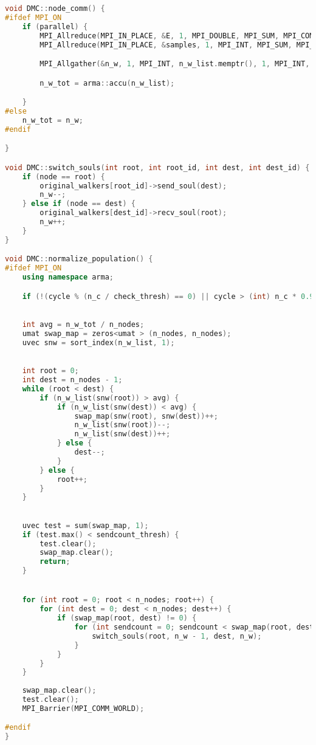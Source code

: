 \newpage
\begin{lstlisting}[language=c++, basicstyle=\scriptsize]
void DMC::node_comm() {
#ifdef MPI_ON
    if (parallel) {
        MPI_Allreduce(MPI_IN_PLACE, &E, 1, MPI_DOUBLE, MPI_SUM, MPI_COMM_WORLD);
        MPI_Allreduce(MPI_IN_PLACE, &samples, 1, MPI_INT, MPI_SUM, MPI_COMM_WORLD);

        MPI_Allgather(&n_w, 1, MPI_INT, n_w_list.memptr(), 1, MPI_INT, MPI_COMM_WORLD);

        n_w_tot = arma::accu(n_w_list);

    }
#else
    n_w_tot = n_w;
#endif

}

void DMC::switch_souls(int root, int root_id, int dest, int dest_id) {
    if (node == root) {
        original_walkers[root_id]->send_soul(dest);
        n_w--;
    } else if (node == dest) {
        original_walkers[dest_id]->recv_soul(root);
        n_w++;
    }
}

void DMC::normalize_population() {
#ifdef MPI_ON
    using namespace arma;

    if (!(cycle % (n_c / check_thresh) == 0) || cycle > (int) n_c * 0.9) return;

    
    int avg = n_w_tot / n_nodes;
    umat swap_map = zeros<umat > (n_nodes, n_nodes);
    uvec snw = sort_index(n_w_list, 1);

    
    int root = 0;
    int dest = n_nodes - 1;
    while (root < dest) {
        if (n_w_list(snw(root)) > avg) {
            if (n_w_list(snw(dest)) < avg) {
                swap_map(snw(root), snw(dest))++;
                n_w_list(snw(root))--;
                n_w_list(snw(dest))++;
            } else {
                dest--;
            }
        } else {
            root++;
        }
    }

    
    uvec test = sum(swap_map, 1);
    if (test.max() < sendcount_thresh) {
        test.clear();
        swap_map.clear();
        return;
    }


    for (int root = 0; root < n_nodes; root++) {
        for (int dest = 0; dest < n_nodes; dest++) {
            if (swap_map(root, dest) != 0) {
                for (int sendcount = 0; sendcount < swap_map(root, dest); sendcount++) {
                    switch_souls(root, n_w - 1, dest, n_w);
                }
            }
        }
    }
    
    swap_map.clear();
    test.clear();
    MPI_Barrier(MPI_COMM_WORLD);

#endif
}
\end{lstlisting}
